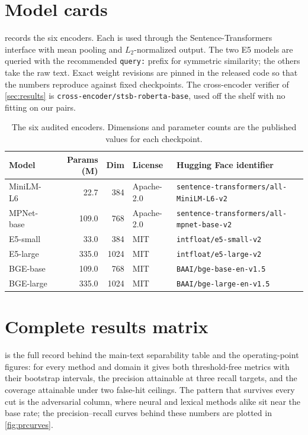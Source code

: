 \section{Model cards}
\label{app:modelcards}

 records the six encoders. Each is used through the
Sentence-Transformers interface with mean pooling and $L_2$-normalized output. The two
\mbox{E5} models are queried with the recommended \texttt{query:} prefix for symmetric
similarity; the others take the raw text. Exact weight revisions are pinned in the released
code so that the numbers reproduce against fixed checkpoints. The cross-encoder verifier of
\cref{sec:results} is \texttt{cross-encoder/stsb-roberta-base}, used off the shelf with no
fitting on our pairs.

\begin{table}[t]
  \centering
  \begin{threeparttable}
    \caption{The six audited encoders. Dimensions and parameter counts are the published
      values for each checkpoint.}
    \label{tab:modelcards}
    \begingroup\small
    \begin{tabular}{l r r l l}
      \toprule
      Model & Params (M) & Dim & License & Hugging Face identifier \\
      \midrule
      MiniLM-L6   &  22.7 &  384 & Apache-2.0 & \texttt{sentence-transformers/all-MiniLM-L6-v2} \\
      MPNet-base  & 109.0 &  768 & Apache-2.0 & \texttt{sentence-transformers/all-mpnet-base-v2} \\
      E5-small    &  33.0 &  384 & MIT        & \texttt{intfloat/e5-small-v2} \\
      E5-large    & 335.0 & 1024 & MIT        & \texttt{intfloat/e5-large-v2} \\
      BGE-base    & 109.0 &  768 & MIT        & \texttt{BAAI/bge-base-en-v1.5} \\
      BGE-large   & 335.0 & 1024 & MIT        & \texttt{BAAI/bge-large-en-v1.5} \\
      \bottomrule
    \end{tabular}
    \endgroup
  \end{threeparttable}
\end{table}

\section{Complete results matrix}
\label{app:fullresults}
 is the full record behind the main-text separability table and the
operating-point figures: for every method and domain it gives both threshold-free metrics with
their bootstrap intervals, the precision attainable at three recall targets, and the coverage
attainable under two false-hit ceilings. The pattern that survives every cut is the adversarial
column, where neural and lexical methods alike sit near the base rate; the precision--recall
curves behind these numbers are plotted in \cref{fig:prcurves}.


